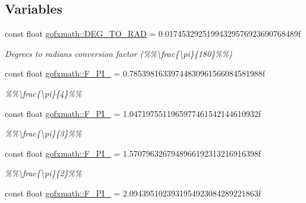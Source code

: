 \subsection*{Variables}
\begin{DoxyCompactItemize}
\item 
\hypertarget{group___scalar_math_consts_ga12f80781f7eb3697d59ab8a1ed1a4cf3}{}const float \hyperlink{group___scalar_math_consts_ga12f80781f7eb3697d59ab8a1ed1a4cf3}{gofxmath\+::\+D\+E\+G\+\_\+\+T\+O\+\_\+\+R\+A\+D} = 0.\+01745329251994329576923690768489f\label{group___scalar_math_consts_ga12f80781f7eb3697d59ab8a1ed1a4cf3}

\begin{DoxyCompactList}\small\item\em Degrees to radians conversion factor (\%\%\textbackslash{}frac\{\textbackslash{}pi\}\{180\}\%\%) \end{DoxyCompactList}\item 
\hypertarget{group___scalar_math_consts_ga64a9a19137bce5d9eb22c3e5ef7766ed}{}const float \hyperlink{group___scalar_math_consts_ga64a9a19137bce5d9eb22c3e5ef7766ed}{gofxmath\+::\+F\+\_\+\+P\+I\+\_} = 0.\+78539816339744830961566084581988f\label{group___scalar_math_consts_ga64a9a19137bce5d9eb22c3e5ef7766ed}

\begin{DoxyCompactList}\small\item\em \%\%\textbackslash{}frac\{\textbackslash{}pi\}\{4\}\%\% \end{DoxyCompactList}\item 
\hypertarget{group___scalar_math_consts_gac7dedc26e0695833bd1aa3a17dd257c5}{}const float \hyperlink{group___scalar_math_consts_gac7dedc26e0695833bd1aa3a17dd257c5}{gofxmath\+::\+F\+\_\+\+P\+I\+\_} = 1.\+0471975511965977461542144610932f\label{group___scalar_math_consts_gac7dedc26e0695833bd1aa3a17dd257c5}

\begin{DoxyCompactList}\small\item\em \%\%\textbackslash{}frac\{\textbackslash{}pi\}\{3\}\%\% \end{DoxyCompactList}\item 
\hypertarget{group___scalar_math_consts_ga946e6dc7aaa53bbc0d3b6d433891c7a8}{}const float \hyperlink{group___scalar_math_consts_ga946e6dc7aaa53bbc0d3b6d433891c7a8}{gofxmath\+::\+F\+\_\+\+P\+I\+\_} = 1.\+5707963267948966192313216916398f\label{group___scalar_math_consts_ga946e6dc7aaa53bbc0d3b6d433891c7a8}

\begin{DoxyCompactList}\small\item\em \%\%\textbackslash{}frac\{\textbackslash{}pi\}\{2\}\%\% \end{DoxyCompactList}\item 
\hypertarget{group___scalar_math_consts_gad791e3195a27956d70d1d6912fa386a5}{}const float \hyperlink{group___scalar_math_consts_gad791e3195a27956d70d1d6912fa386a5}{gofxmath\+::\+F\+\_\+P\+I\+\_} = 2.\+0943951023931954923084289221863f\label{group___scalar_math_consts_gad791e3195a27956d70d1d6912fa386a5}


\end{DoxyCompactItemize}

